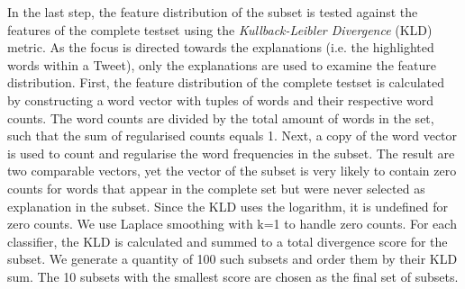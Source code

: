 In the last step, the feature distribution of the subset is tested against the features of the complete testset using the \textit{Kullback-Leibler Divergence} (KLD) metric. As the focus is directed towards the explanations (i.e. the highlighted words within a Tweet), only the explanations are used to examine the feature distribution. First, the feature distribution of the complete testset is calculated by constructing a word vector with tuples of words and their respective word counts. The word counts are divided by the total amount of words in the set, such that the sum of regularised counts equals 1. Next, a copy of the word vector is used to count and regularise the word frequencies in the subset. The result are two comparable vectors, yet the vector of the subset is very likely to contain zero counts for words that appear in the complete set but were never selected as explanation in the subset. Since the KLD uses the logarithm, it is undefined for zero counts. We use Laplace smoothing with k=1 to handle zero counts. For each classifier, the KLD is calculated and summed to a total divergence score for the subset.\newline
We generate a quantity of 100 such subsets and order them by their KLD sum. The 10 subsets with the smallest score are chosen as the final set of subsets.\newline




